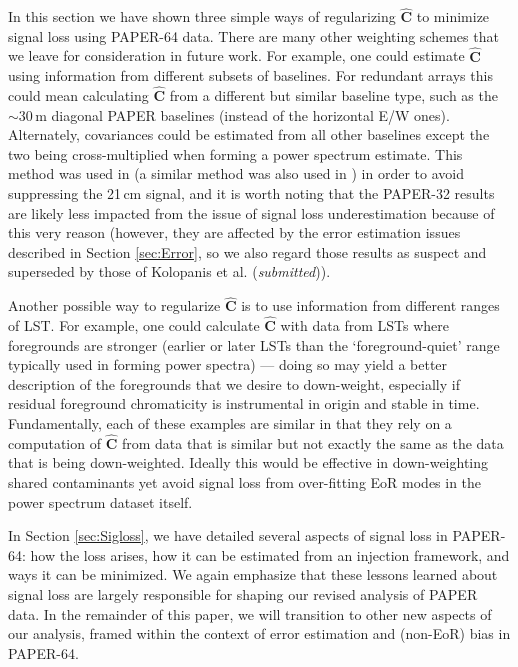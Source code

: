 \documentclass[preprint2,numberedappendix,tighten]{aastex6}  %
\begin{document}
In this section we have shown three simple ways of regularizing $\widehat{\textbf{C}}$ to minimize signal loss using PAPER-64 
data. There are many other weighting schemes that we leave for consideration in future work. For example, one could estimate 
$\widehat{\textbf{C}}$ using information from different subsets of baselines. For redundant arrays this could mean calculating $
\widehat{\textbf{C}}$ from a different but similar baseline type, such as the $\sim30$\,m diagonal PAPER baselines (instead of the 
horizontal E/W ones). Alternately, covariances could be estimated from all other baselines except the two being cross-multiplied 
when forming a power spectrum estimate. This method was used in \citet{parsons_et_al2014} (a similar method was also used in \citet{dillon_et_al2015}) in order to avoid suppressing the 
21\,cm signal, and it is worth noting that the PAPER-32 results are likely less impacted from the issue of signal loss underestimation 
because of this very reason (however, they are affected by the error estimation issues described in Section \ref{sec:Error}, so 
we also regard those results as suspect and superseded by those of Kolopanis et al. (\textit{submitted})).

Another possible way to regularize $\widehat{\textbf{C}}$ is to use information from different ranges of LST. For example, one could 
calculate $\widehat{\textbf{C}}$ with data from LSTs where foregrounds are stronger (earlier or later LSTs than the `foreground-quiet' range typically used in forming power spectra) --- doing so may yield a better description of the foregrounds that we desire to 
down-weight, especially if residual foreground chromaticity is instrumental in origin and stable in time. Fundamentally, each of these examples are similar in that they rely on a computation of $\widehat{\textbf{C}}$ from 
data that is similar but not exactly the same as the data that is being down-weighted. Ideally this would be effective in down-weighting shared contaminants yet avoid signal loss from over-fitting EoR modes in the power spectrum dataset itself. 

In Section \ref{sec:Sigloss}, we have detailed several aspects of signal loss in PAPER-64: how the loss arises, how it can be estimated from an injection framework, and ways it can be minimized. We again emphasize that these lessons learned about signal loss are largely responsible for shaping our revised analysis of PAPER data. In the remainder of this paper, we will transition to other new aspects of our analysis, framed within the context of error estimation and (non-EoR) bias in PAPER-64.
\end{document}
